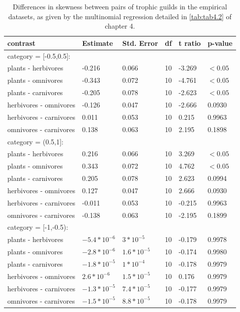 \begin{table}[ht!]
\centering
\caption[Guild pairs differences in skewness]{\color{Gray}Differences in skewness between pairs of trophic guilds in the empirical datasets, as given by the multinomial regression detailed in \cref{tab:tab4.2} of chapter 4.}\label{tab:tabApp4.1.5}
\begin{tabular}{llllll}
\hline
contrast  &                       Estimate       & Std. Error & df & t ratio & p-value \\
\hline
category = [-0.5,0.5]: & & & & & \\
plants - herbivores    & -0.216 & 0.066 & 10 & -3.269 & $<0.05$ \\
plants - omnivores     & -0.343 & 0.072 & 10 & -4.761 & $<0.05$ \\
plants - carnivores    & -0.205 & 0.078 & 10 & -2.623 & $<0.05$ \\
herbivores - omnivores & -0.126 & 0.047 & 10 & -2.666 & 0.0930 \\
herbivores - carnivores &  0.011 & 0.053 & 10 &  0.215 & 0.9963 \\
omnivores - carnivores  & 0.138 & 0.063 & 10 &  2.195 & 0.1898 \\

category = (0.5,1]: & & & & & \\
plants - herbivores    &  0.216 & 0.066 & 10 &  3.269 & $<0.05$ \\
plants - omnivores     &  0.343 & 0.072 & 10 &  4.762 & $<0.05$ \\
plants - carnivores    &  0.205 & 0.078 & 10 &  2.623 & 0.0994 \\
herbivores - omnivores &  0.127 & 0.047 & 10 &  2.666 & 0.0930 \\
herbivores - carnivores & -0.011 & 0.053 & 10 & -0.215 & 0.9963 \\
omnivores - carnivores & -0.138 & 0.063 & 10 & -2.195 & 0.1899 \\

category = [-1,-0.5): & & & & & \\
plants - herbivores    & $-5.4*10^{-6}$ & $3*10^{-5}$ & 10 & -0.179 & 0.9978 \\
plants - omnivores     & $-2.8*10^{-6}$ & $1.6*10^{-5}$ & 10 & -0.174 & 0.9980 \\
plants - carnivores    & $-1.8*10^{-5}$ & $1*10^{-4}$ & 10 & -0.178 & 0.9979 \\
herbivores - omnivores &  $2.6*10^{-6}$ & $1.5*10^{-5}$ & 10 &  0.176 & 0.9979 \\
herbivores - carnivores & $-1.3*10^{-5}$ & $7.4*10^{-5}$ & 10 & -0.177 & 0.9979 \\
omnivores - carnivores & $-1.5*10^{-5}$ & $8.8*10^{-5}$ & 10 &  -0.178 & 0.9979 \\
\hline
\end{tabular}

\end{table}

